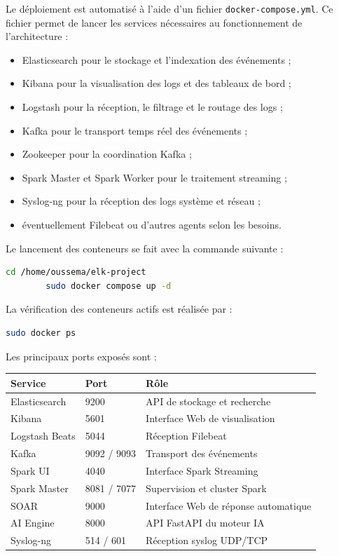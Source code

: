 \documentclass[12pt,a4paper,oneside]{report}
\begin{document}
    Le déploiement est automatisé à l'aide d'un fichier \texttt{docker-compose.yml}. Ce fichier permet de lancer les services nécessaires au fonctionnement de l'architecture :
    
    \begin{itemize}
    	\item Elasticsearch pour le stockage et l'indexation des événements ;
    	\item Kibana pour la visualisation des logs et des tableaux de bord ;
    	\item Logstash pour la réception, le filtrage et le routage des logs ;
    	\item Kafka pour le transport temps réel des événements ;
    	\item Zookeeper pour la coordination Kafka ;
    	\item Spark Master et Spark Worker pour le traitement streaming ;
    	\item Syslog-ng pour la réception des logs système et réseau ;
    	\item éventuellement Filebeat ou d'autres agents selon les besoins.
    \end{itemize}
    
    Le lancement des conteneurs se fait avec la commande suivante :
    
    \begin{lstlisting}[language=bash]
    	cd /home/oussema/elk-project
    	sudo docker compose up -d
    \end{lstlisting}
    
    La vérification des conteneurs actifs est réalisée par :
    
    \begin{lstlisting}[language=bash]
    	sudo docker ps
    \end{lstlisting}
    
    Les principaux ports exposés sont :
    
    \begin{center}
    	\begin{tabular}{|l|l|l|}
    		\hline
    		Service & Port & Rôle \\
    		\hline
    		Elasticsearch & 9200 & API de stockage et recherche \\
    		Kibana & 5601 & Interface Web de visualisation \\
    		Logstash Beats & 5044 & Réception Filebeat \\
    		Kafka & 9092 / 9093 & Transport des événements \\
    		Spark UI & 4040 & Interface Spark Streaming \\
    		Spark Master & 8081 / 7077 & Supervision et cluster Spark \\
    		SOAR & 9000 & Interface Web de réponse automatique \\
    		AI Engine & 8000 & API FastAPI du moteur IA \\
    		Syslog-ng & 514 / 601 & Réception syslog UDP/TCP \\
    		\hline
    	\end{tabular}
    \end{center}
    
\end{document}
